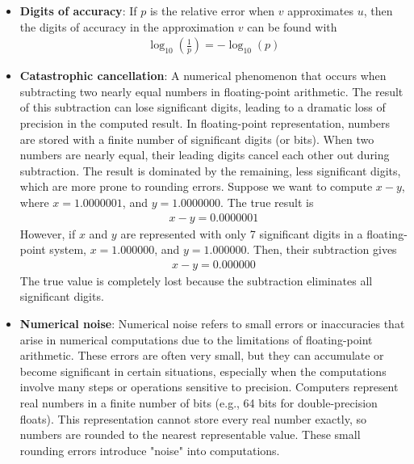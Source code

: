 \documentclass{report}
\begin{document}
\begin{itemize}
\begin{enumerate}
            \end{enumerate}
        \item \textbf{Digits of accuracy}: If $p$ is the relative error when $v$ approximates $u$, then the digits of accuracy in the approximation $v$ can be found with
            \begin{align*}
                \log_{10}{\left(\frac{1}{p}\right)} = -\log_{10}{(p)}
            \end{align*}
        \item \textbf{Catastrophic cancellation}: A numerical phenomenon that occurs when subtracting two nearly equal numbers in floating-point arithmetic. The result of this subtraction can lose significant digits, leading to a dramatic loss of precision in the computed result.
            \bigbreak \noindent 
            In floating-point representation, numbers are stored with a finite number of significant digits (or bits). When two numbers are nearly equal, their leading digits cancel each other out during subtraction. The result is dominated by the remaining, less significant digits, which are more prone to rounding errors.
            \bigbreak \noindent 
            Suppose we want to compute $x-y$, where $x= 1.0000001$, and $y=1.0000000$. The true result is 
            \begin{align*}
                x - y = 0.0000001
            \end{align*}
            \bigbreak \noindent 
            However, if $x$ and $y$ are represented with only 7 significant digits in a floating-point system, $x=1.000000$, and $y=1.000000$. Then, their subtraction gives
            \begin{align*}
                x-y = 0.000000
            \end{align*}
            The true value is completely lost because the subtraction eliminates all significant digits.
        \item \textbf{Numerical noise}: Numerical noise refers to small errors or inaccuracies that arise in numerical computations due to the limitations of floating-point arithmetic. These errors are often very small, but they can accumulate or become significant in certain situations, especially when the computations involve many steps or operations sensitive to precision.
            \bigbreak \noindent 
            Computers represent real numbers in a finite number of bits (e.g., 64 bits for double-precision floats).
            \bigbreak \noindent 
            This representation cannot store every real number exactly, so numbers are rounded to the nearest representable value. These small rounding errors introduce "noise" into computations.

\end{itemize}
\end{document}
